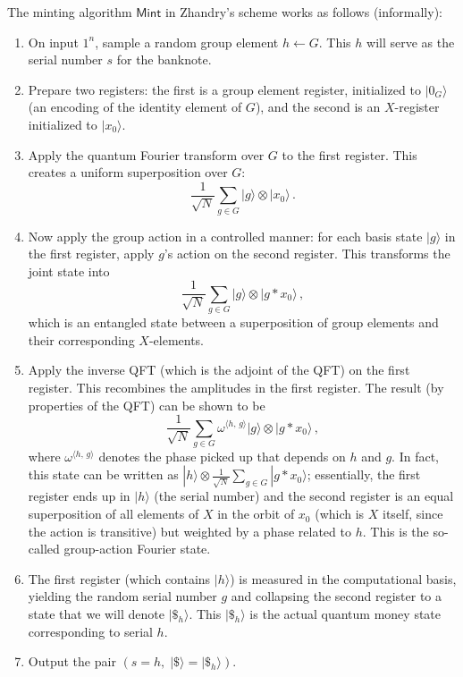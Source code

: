 \documentclass[12pt]{report}
\begin{document}
The minting algorithm $\mathsf{Mint}$ in Zhandry’s scheme works as follows (informally):
\begin{enumerate}
    \item On input $1^n$, sample a random group element $h \leftarrow G$. This $h$ will serve as the serial number $s$ for the banknote.
    \item Prepare two registers: the first is a group element register, initialized to $|0_G\rangle$ (an encoding of the identity element of $G$), and the second is an $X$-register initialized to $|x_0\rangle$.
    \item Apply the quantum Fourier transform over $G$ to the first register. This creates a uniform superposition over $G$: 
    \[
    \frac{1}{\sqrt{N}} \sum_{g \in G} |g\rangle \otimes |x_0\rangle\,.
    \] 
    \item Now apply the group action in a controlled manner: for each basis state $|g\rangle$ in the first register, apply $g$’s action on the second register. This transforms the joint state into 
    \[
    \frac{1}{\sqrt{N}} \sum_{g \in G} |g\rangle \otimes |g * x_0\rangle\,,
    \] 
    which is an entangled state between a superposition of group elements and their corresponding $X$-elements.
    \item Apply the inverse QFT (which is the adjoint of the QFT) on the first register. This recombines the amplitudes in the first register. The result (by properties of the QFT) can be shown to be 
    \[
    \frac{1}{\sqrt{N}} \sum_{g \in G} \omega^{\langle h,\,g \rangle} |g\rangle \otimes |g * x_0\rangle\,,
    \] 
    where $\omega^{\langle h,\,g \rangle}$ denotes the phase picked up that depends on $h$ and $g$. In fact, this state can be written as $|h\rangle \otimes \frac{1}{\sqrt{N}}\sum_{g \in G} |g * x_0\rangle$; essentially, the first register ends up in $|h\rangle$ (the serial number) and the second register is an equal superposition of all elements of $X$ in the orbit of $x_0$ (which is $X$ itself, since the action is transitive) but weighted by a phase related to $h$. This is the so-called group-action Fourier state.
    \item The first register (which contains $|h\rangle$) is measured in the computational basis, yielding the random serial number $g$ and collapsing the second register to a state that we will denote $|\$_h\rangle$. This $|\$_h\rangle$ is the actual quantum money state corresponding to serial $h$.
    \item Output the pair $(s = h,\; |\$\rangle = |\$_h\rangle)$.
\end{enumerate}
\end{document}
